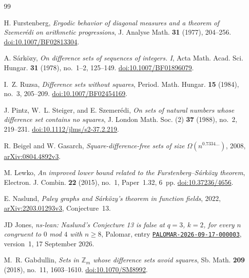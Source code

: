 \documentclass[11pt]{article}
\theoremstyle{definition}
\theoremstyle{remark}
\begin{document}
\begin{thebibliography}{99}

H. Furstenberg,
\emph{Ergodic behavior of diagonal measures and a theorem of
Szemer\'edi on arithmetic progressions},
J. Analyse Math. \textbf{31} (1977), 204--256.
\href{https://doi.org/10.1007/BF02813304}{doi:10.1007/BF02813304}.

A. S\'ark\"ozy,
\emph{On difference sets of sequences of integers. I},
Acta Math. Acad. Sci. Hungar. \textbf{31} (1978), no.~1--2, 125--149.
\href{https://doi.org/10.1007/BF01896079}{doi:10.1007/BF01896079}.

I.~Z. Ruzsa, \emph{Difference sets without squares},
Period. Math. Hungar. \textbf{15} (1984), no.~3, 205--209.
\href{https://doi.org/10.1007/BF02454169}{doi:10.1007/BF02454169}.

J. Pintz, W.~L. Steiger, and E. Szemer\'edi,
\emph{On sets of natural numbers whose difference set contains no squares},
J. London Math. Soc. (2) \textbf{37} (1988), no.~2, 219--231.
\href{https://doi.org/10.1112/jlms/s2-37.2.219}{doi:10.1112/jlms/s2-37.2.219}.

R. Beigel and W. Gasarch,
\emph{Square-difference-free sets of size $\Omega(n^{0.7334\ldots})$},
2008, \href{https://arxiv.org/abs/0804.4892v3}{arXiv:0804.4892v3}.

M. Lewko,
\emph{An improved lower bound related to the
Furstenberg--S\'ark\"ozy theorem},
Electron. J. Combin. \textbf{22} (2015), no.~1, Paper~1.32, 6~pp.
\href{https://doi.org/10.37236/4656}{doi:10.37236/4656}.

E. Naslund,
\emph{Paley graphs and S\'ark\"ozy's theorem in function fields},
2022, \href{https://arxiv.org/abs/2203.01293v3}{arXiv:2203.01293v3},
Conjecture~13.

JD Jones,
\emph{ns-lean: Naslund's Conjecture 13 is false at $q=3$, $k=2$, for every
$n$ congruent to $0$ mod $4$ with $n\ge8$},
Palomar, entry
\href{https://palomar-registry.org/entry?id=PALOMAR-2026-09-17-000003\&version=1}{\texttt{PALOMAR-2026-09-17-000003}},
version~1, 17 September 2026.

M.~R. Gabdullin,
\emph{Sets in $\mathbb Z_m$ whose difference sets avoid squares},
Sb. Math. \textbf{209} (2018), no.~11, 1603--1610.
\href{https://doi.org/10.1070/SM8992}{doi:10.1070/SM8992}.


\end{thebibliography}
\end{document}
